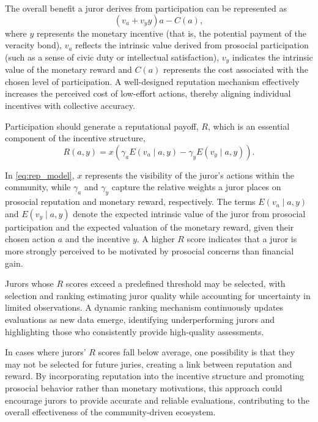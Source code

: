 \documentclass{article}
\begin{document}
The overall benefit a juror derives from participation can be represented as 
\begin{equation*}
    (v_a + v_y y) a -C(a),
\end{equation*}
where $y$ represents the monetary incentive (that is, the potential payment of the veracity bond), $v_a$ reflects the intrinsic value derived from prosocial participation (such as a sense of civic duty or intellectual satisfaction), $v_y$ indicates the intrinsic value of the monetary reward and $C(a)$ represents the cost associated with the chosen level of participation. A well-designed reputation mechanism effectively increases the perceived cost of low-effort actions, thereby aligning individual incentives with collective accuracy.

Participation should generate a reputational payoff, $R$, which is an essential component of the incentive structure,
\begin{equation}
    R(a,y) = x\left(\gamma_a E(v_a \mid a, y) - \gamma_y E(v_y \mid a, y)\right).
\label{eq:rep_model}
\end{equation}

In \cref{eq:rep_model}, $x$ represents the visibility of the juror's actions within the community, while $\gamma_a$ and $\gamma_y$ capture the relative weights a juror places on prosocial reputation and monetary reward, respectively. The terms $E(v_a \mid a, y)$ and $E(v_y \mid a,y)$ denote the expected intrinsic value of the juror from prosocial participation and the expected valuation of the monetary reward, given their chosen action $a$ and the incentive $y$. A higher $R$ score indicates that a juror is more strongly perceived to be motivated by prosocial concerns than financial gain.

Jurors whose $R$ scores exceed a predefined threshold may be selected, with selection and ranking estimating juror quality while accounting for uncertainty in limited observations. A dynamic ranking mechanism continuously updates evaluations as new data emerge, identifying underperforming jurors and highlighting those who consistently provide high-quality assessments.

In cases where jurors' $R$ scores fall below average, one possibility is that they may not be selected for future juries, creating a link between reputation and reward. By incorporating reputation into the incentive structure and promoting prosocial behavior rather than monetary motivations, this approach could encourage jurors to provide accurate and reliable evaluations, contributing to the overall effectiveness of the community-driven ecosystem.
\end{document}
